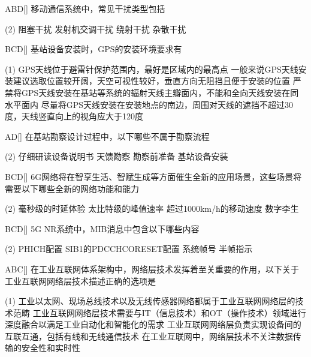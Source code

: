 \begin{choice}{\;ABD\;}[]
    移动通信系统中，常见干扰类型包括
    \begin{tasks}(2)
        \task 阻塞干扰
        \task 发射机交调干扰
        \task 绕射干扰
        \task 杂散干扰
    \end{tasks}
\end{choice}


\begin{choice}{\;BCD\;}[]
    基站设备安装时，GPS的安装环境要求有
    \begin{tasks}(1)
        \task GPS天线位于避雷针保护范围内，最好是区域内的最高点
        \task 一般来说GPS天线安装建议选取位置较开阔，天空可视性较好，垂直方向无阻挡且便于安装的位置
        \task 严禁将GPS天线安装在基站等系统的辐射天线主瓣面内，不能和全向天线安装在同水平面内
        \task 尽量将GPS天线安装在安装地点的南边，周围对天线的遮挡不超过30度，天线竖直向上的视角应大于120度
    \end{tasks}
\end{choice}

\begin{choice}{\;AD\;}[]
    在基站勘察设计过程中，以下哪些不属于勘察流程
    \begin{tasks}(2)
        \task 仔细研读设备说明书
        \task 天馈勘察
        \task 勘察前准备
        \task 基站设备安装
    \end{tasks}
\end{choice}

\begin{choice}{\;BCD\;}[]
    6G网络将在智享生活、智赋生成等方面催生全新的应用场景，这些场景将需要以下哪些全新的网络功能和能力
    \begin{tasks}(2)
        \task 毫秒级的时延体验
        \task 太比特级的峰值速率
        \task 超过1000km/h的移动速度
        \task 数字李生
    \end{tasks}
\end{choice}

\begin{choice}{\;BCD\;}[]
    5G NR系统中，MIB消息中包含以下哪些内容

    \begin{tasks}(2)
        \task PHICH配置
        \task SIB1的PDCCHCORESET配置
        \task 系统帧号
        \task 半帧指示
    \end{tasks}
\end{choice}

\begin{choice}{\;ABC\;}[]
    在工业互联网体系架构中，网络层技术发挥着至关重要的作用，以下关于工业互联网网络层技术描述正确的选项是
    \begin{tasks}(1)
        \task 工业以太网、现场总线技术以及无线传感器网络都属于工业互联网网络层的技术范畴
        \task 工业互联网网络层技术需要与IT（信息技术）和OT（操作技术）领域进行深度融合以满足工业自动化和智能化的需求
        \task 工业互联网网络层负责实现设备间的互联互通，包括有线和无线通信技术
        \task 在工业互联网中，网络层技术不关注数据传输的安全性和实时性
    \end{tasks}
\end{choice}

